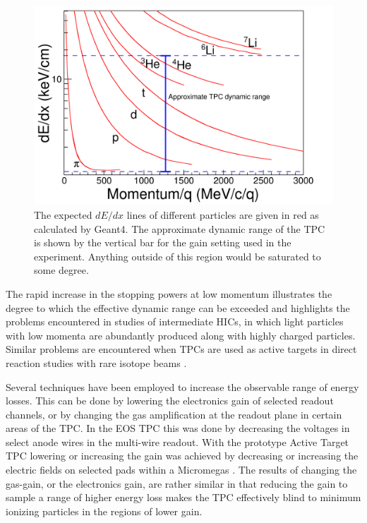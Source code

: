 \documentclass[review,number,sort&compress]{elsarticle}
\begin{document}
  
\begin{figure}[ht!]
\includegraphics[width=\linewidth]{fig1}
\caption{The expected $dE/dx$ lines of different particles are given in red as calculated by Geant4. The approximate dynamic range of the TPC is shown by the vertical bar for the gain setting used in the experiment. Anything outside of this region would be saturated to some degree.}
\label{fig:intro}
\end{figure}

The rapid increase in the stopping powers at low momentum illustrates the degree to which the effective dynamic range can be exceeded and highlights the problems encountered in studies of intermediate HICs, in which light particles with low momenta are abundantly produced along with highly charged particles. Similar problems are encountered when TPCs are used as active targets in direct reaction studies with rare isotope beams \cite{pattpc}. 

Several techniques have been employed to increase the observable range of energy losses. This can be done by lowering the electronics gain of selected readout channels, or by changing the gas amplification at the readout plane in certain areas of the TPC. In the EOS TPC \cite{eos} this was done by decreasing the voltages in select anode wires in the multi-wire readout. With the prototype Active Target TPC lowering or increasing the gain was achieved by decreasing or increasing the electric fields on selected pads within a Micromegas \cite{pattpc}. The results of changing the gas-gain, or the electronics gain, are rather similar in that reducing the gain to sample a range of higher energy loss makes the TPC effectively blind to minimum ionizing particles in  the regions of lower gain.
\end{document}
